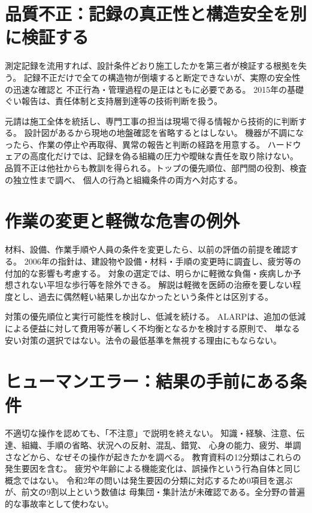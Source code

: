 \section{品質不正：記録の真正性と構造安全を別に検証する}
\label{theory:safety:quality}
測定記録を流用すれば、設計条件どおり施工したかを第三者が検証する根拠を失う。
記録不正だけで全ての構造物が倒壊すると断定できないが、実際の安全性の迅速な確認と
不正行為・管理過程の是正はともに必要である。
2015年の基礎ぐい報告は、責任体制と支持層到達等の技術判断を扱う。\cite{saf53_pile2015}

元請は施工全体を統括し、専門工事の担当は現場で得る情報から技術的に判断する。
設計図があるから現地の地盤確認を省略するとはしない。
機器が不調になったら、作業の停止や再取得、異常の報告と判断の経路を用意する。
ハードウェアの高度化だけでは、記録を偽る組織の圧力や曖昧な責任を取り除けない。
品質不正は他社からも教訓を得られる。トップの優先順位、部門間の役割、検査の独立性まで調べ、
個人の行為と組織条件の両方へ対応する。\cite{saf53_quality2020}

\section{作業の変更と軽微な危害の例外}
\label{theory:safety:workplace}
材料、設備、作業手順や人員の条件を変更したら、以前の評価の前提を確認する。
2006年の指針は、建設物や設備・材料・手順の変更時に調査し、疲労等の付加的な影響も考慮する。
対象の選定では、明らかに軽微な負傷・疾病しか予想されない平坦な歩行等を除外できる。
解説は軽微を医師の治療を要しない程度とし、過去に偶然軽い結果しか出なかったという条件とは区別する。\cite{saf53_workplace2006}

対策の優先順位と実行可能性を検討し、低減を続ける。
ALARPは、追加の低減による便益に対して費用等が著しく不均衡となるかを検討する原則で、
単なる安い対策の選択ではない。法令の最低基準を無視する理由にもならない。\cite{saf_parliament2006}

\section{ヒューマンエラー：結果の手前にある条件}
\label{theory:safety:human}
不適切な操作を認めても、「不注意」で説明を終えない。
知識・経験、注意、伝達、組織、手順の省略、状況への反射、混乱、錯覚、
心身の能力、疲労、単調さなどから、なぜその操作が起きたかを調べる。
教育資料の12分類はこれらの発生要因を含む。\cite{saf53_human12}
疲労や年齢による機能変化は、誤操作という行為自体と同じ概念ではない。
令和2年の問いは発生要因の分類に対応するため0項目を選ぶが、前文の9割以上という数値は
母集団・集計法が未確認である。全分野の普遍的な事故率として使わない。


